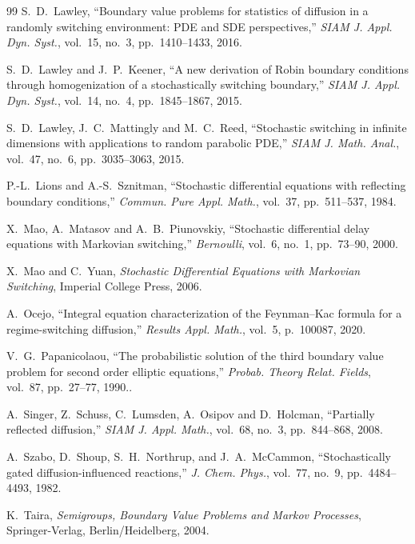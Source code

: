 \documentclass[11pt]{amsart}
\theoremstyle{plain}
\theoremstyle{definition}
\theoremstyle{remark}
\begin{document}
\begin{thebibliography}{99}
		S.~D.~Lawley, ``Boundary value problems for statistics of diffusion in a randomly switching environment: PDE and SDE perspectives,'' \textit{SIAM J. Appl. Dyn. Syst.}, vol.~15, no.~3, pp.~1410--1433, 2016.
		
		S.~D.~Lawley and J.~P.~Keener, ``A new derivation of Robin boundary conditions through homogenization of a stochastically switching boundary,'' \textit{SIAM J. Appl. Dyn. Syst.}, vol.~14, no.~4, pp.~1845--1867, 2015.
		
		S.~D.~Lawley, J.~C.~Mattingly and M.~C.~Reed, ``Stochastic switching in infinite dimensions with applications to random parabolic PDE,'' \textit{SIAM J. Math. Anal.}, vol.~47, no.~6, pp.~3035--3063, 2015.
		
		P.-L.~Lions and A.-S.~Sznitman, ``Stochastic differential equations with reflecting boundary conditions,'' \textit{Commun. Pure Appl. Math.}, vol.~37, pp.~511--537, 1984.
		
		X.~Mao, A.~Matasov and A.~B.~Piunovskiy, ``Stochastic differential delay equations with Markovian switching,'' \textit{Bernoulli}, vol.~6, no.~1, pp.~73--90, 2000.
		
		X.~Mao and C.~Yuan, \textit{Stochastic Differential Equations with Markovian Switching}, Imperial College Press, 2006.
		
		A.~Ocejo, ``Integral equation characterization of the Feynman–Kac formula for a regime-switching diffusion,'' \textit{Results Appl. Math.}, vol.~5, p.~100087, 2020.
		
		V.~G.~Papanicolaou, ``The probabilistic solution of the third boundary value problem for second order elliptic equations,'' \textit{Probab. Theory Relat. Fields}, vol.~87, pp.~27--77, 1990..
		
		A.~Singer, Z.~Schuss, C.~Lumsden, A.~Osipov and D.~Holcman, ``Partially reflected diffusion,'' \textit{SIAM J. Appl. Math.}, vol.~68, no.~3, pp.~844--868, 2008.
		
		A.~Szabo, D.~Shoup, S.~H.~Northrup, and J.~A.~McCammon, ``Stochastically gated diffusion-influenced reactions,'' \textit{J. Chem. Phys.}, vol.~77, no.~9, pp.~4484--4493, 1982.
		
		K.~Taira, \textit{Semigroups, Boundary Value Problems and Markov Processes}, Springer-Verlag, Berlin/Heidelberg, 2004.
		

\end{thebibliography}
\end{document}
